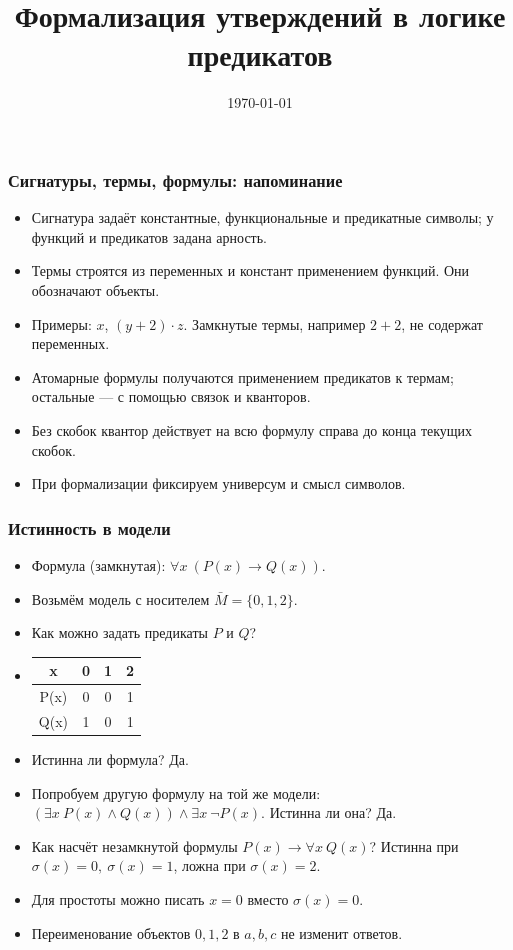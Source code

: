 \documentclass[10pt]{beamer}
\title{Формализация утверждений в логике предикатов}
\date{\today}
\begin{document}
\begin{frame}[plain]
    \maketitle
\end{frame}

\begin{frame}
    \frametitle{Сигнатуры, термы, формулы: напоминание}
    \begin{itemize}
        \item Сигнатура задаёт константные, функциональные и предикатные символы; у функций и предикатов задана арность.
        \item Термы строятся из переменных и констант применением функций. Они обозначают объекты.
        \item Примеры: $x$, $(y+2)\cdot z$. Замкнутые термы, например $2+2$, не содержат переменных.
        \pause
        \item Атомарные формулы получаются применением предикатов к термам; остальные --- с помощью связок и кванторов.
        \item Без скобок квантор действует на всю формулу справа до конца текущих скобок.
        \item При формализации фиксируем универсум и смысл символов.
    \end{itemize}
\end{frame}

\begin{frame}
    \frametitle{Истинность в модели}
    \begin{itemize}
        \item Формула (замкнутая): $\forall x ~ (P(x) \to Q(x))$.
        \item Возьмём модель с носителем $\bar{M} = \{0,1,2\}$.
        \item Как можно задать предикаты $P$ и $Q$? \pause
        \item[] \begin{tabular}{c | c c c}
            x & 0 & 1 & 2 \\ \hline
            P(x) & 0 & 0 & 1 \\
            Q(x) & 1 & 0 & 1
        \end{tabular}
        \item Истинна ли формула? \pause Да. \pause
        \item Попробуем другую формулу на той же модели:  $(\exists x ~ P(x) \land Q(x)) \land \exists x ~ \neg P(x)$. Истинна ли она? \pause Да. \pause
        \item Как насчёт незамкнутой формулы $P(x) \to \forall x ~ Q(x)$? \pause Истинна при $\sigma(x) = 0,~\sigma(x) = 1$, ложна при $\sigma(x) = 2$. \pause
        \item Для простоты можно писать $x = 0$ вместо $\sigma(x) = 0$. \pause
        \item Переименование объектов $0,1,2$ в $a,b,c$ не изменит ответов.
    \end{itemize}
\end{frame}
\end{document}

